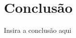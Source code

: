 \chapter{Conclusão} \label{conclusao}

Insira a conclusão aqui







\noindent
\begin{minipage}{\linewidth}
\label{tcc2_gantt_fig}
\end{minipage}